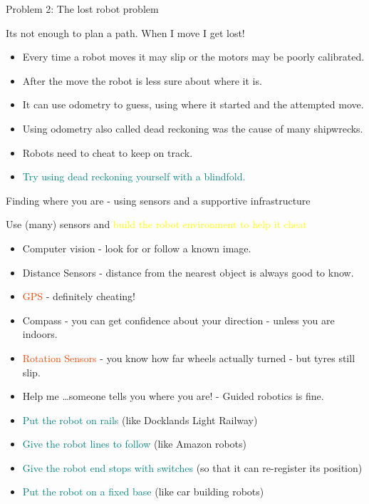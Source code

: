 \documentclass[color=pdftex,usenames,dvipsnames, aspectratio=169]{beamer}
\begin{document}
\begin{frame}{Problem 2: The lost robot problem}
\begin{block}{Its not enough to plan a path.  When I move I get lost!}
\begin{itemize}
  \item Every time a robot \alert{moves} it may slip or the motors may be poorly calibrated.  
  \item After the move the robot is less sure about where it is.
  \item It can use \alert{odometry} to guess, using where it started and the attempted move.
  \item Using odometry  \alert{also called dead reckoning} was the cause of many shipwrecks.
  \item Robots need to cheat to keep on track.
  \item \textcolor{teal}{Try using dead reckoning yourself with a blindfold.}
\end{itemize}
\end{block}

\end{frame}

\begin{frame}{Finding where you are - using sensors and a supportive infrastructure}

\begin{block}{Use (many) sensors and \textcolor{yellow}{build the robot environment to help it cheat}}
\begin{itemize}
\item \alert{Computer vision} - look for or follow a known image.
\item \textcolor{OliveGreen}{Distance Sensors} - distance from the nearest object is always good to know.
\item \textcolor{OrangeRed}{GPS} - definitely cheating!
\item \textcolor{OliveGreen}{Compass} - you can get confidence about your direction - unless you are indoors.
\item \textcolor{OrangeRed}{Rotation Sensors} - you know how far wheels actually turned - but tyres still slip.
\item \textcolor{OliveGreen}{Help me} \dots someone tells you where you are! - Guided robotics is fine.
\item \textcolor{teal}{Put the robot on rails} (like Docklands Light Railway)
\item \textcolor{teal}{Give the robot lines to follow} (like Amazon robots)
\item \textcolor{teal}{Give the robot end stops with switches} (so that it can re-register its position)
\item \textcolor{teal}{Put the robot on a fixed base} (like car building robots)
\end{itemize}
\end{block}

\end{frame}
\end{document}
